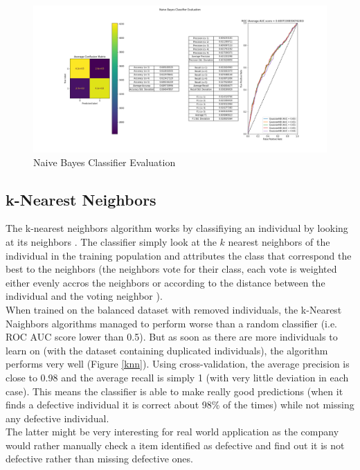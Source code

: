 \begin{figure}
    \center
    \includegraphics[scale=0.32]{img/nbc_d.png}
    \caption{Naive Bayes Classifier Evaluation}
    \label{nbc}
\end{figure}

\subsection{k-Nearest Neighbors}
The k-nearest neighbors algorithm works by classifiying an individual by looking at its neighbors \cite{knn_wikipedia}. The classifier simply look at the \(k\) nearest neighbors of the individual in the training population and attributes the class that correspond the best to the neighbors (the neighbors vote for their class, each vote is weighted either evenly accros the neighbors or according to the distance between the individual and the voting neighbor \cite{knn_scikit}).\\

When trained on the balanced dataset with removed individuals, the k-Nearest Naighbors algorithms managed to perform worse than a random classifier (i.e. ROC AUC score lower than 0.5). But as soon as there are more individuals to learn on (with the dataset containing duplicated individuals), the algorithm performs very well (Figure \ref{knn}). Using cross-validation, the average precision is close to 0.98 and the average recall is simply 1 (with very little deviation in each case). This means the classifier is able to make really good predictions (when it finds a defective individual it is correct about 98\% of the times) while not missing any defective individual.\\
The latter might be very interesting for real world application as the company would rather manually check a item identified as defective and find out it is not defective rather than missing defective ones.


